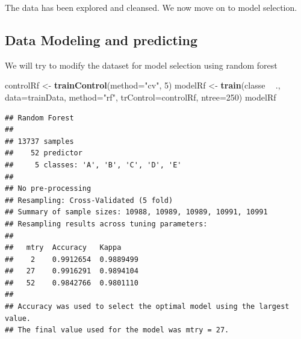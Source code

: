 \documentclass[
]{article}
\newenvironment{Shaded}{\begin{snugshade}}{\end{snugshade}}
\newcommand{\DataTypeTok}[1]{\textcolor[rgb]{0.13,0.29,0.53}{#1}}
\newcommand{\DecValTok}[1]{\textcolor[rgb]{0.00,0.00,0.81}{#1}}
\newcommand{\FloatTok}[1]{\textcolor[rgb]{0.00,0.00,0.81}{#1}}
\newcommand{\KeywordTok}[1]{\textcolor[rgb]{0.13,0.29,0.53}{\textbf{#1}}}
\newcommand{\NormalTok}[1]{#1}
\newcommand{\OperatorTok}[1]{\textcolor[rgb]{0.81,0.36,0.00}{\textbf{#1}}}
\newcommand{\StringTok}[1]{\textcolor[rgb]{0.31,0.60,0.02}{#1}}
\begin{document}
\begin{Shaded}
\end{Shaded}

The data has been explored and cleansed. We now move on to model
selection.

\hypertarget{data-modeling-and-predicting}{%
\subsection{Data Modeling and
predicting}\label{data-modeling-and-predicting}}

We will try to modify the dataset for model selection using random
forest

\begin{Shaded}
\begin{Highlighting}[]
\NormalTok{controlRf <-}\StringTok{ }\KeywordTok{trainControl}\NormalTok{(}\DataTypeTok{method=}\StringTok{"cv"}\NormalTok{, }\DecValTok{5}\NormalTok{)}
\NormalTok{modelRf <-}\StringTok{ }\KeywordTok{train}\NormalTok{(classe }\OperatorTok{~}\StringTok{ }\NormalTok{., }\DataTypeTok{data=}\NormalTok{trainData, }\DataTypeTok{method=}\StringTok{"rf"}\NormalTok{, }\DataTypeTok{trControl=}\NormalTok{controlRf, }\DataTypeTok{ntree=}\DecValTok{250}\NormalTok{)}
\NormalTok{modelRf}
\end{Highlighting}
\end{Shaded}

\begin{verbatim}
## Random Forest 
## 
## 13737 samples
##    52 predictor
##     5 classes: 'A', 'B', 'C', 'D', 'E' 
## 
## No pre-processing
## Resampling: Cross-Validated (5 fold) 
## Summary of sample sizes: 10988, 10989, 10989, 10991, 10991 
## Resampling results across tuning parameters:
## 
##   mtry  Accuracy   Kappa    
##    2    0.9912654  0.9889499
##   27    0.9916291  0.9894104
##   52    0.9842766  0.9801110
## 
## Accuracy was used to select the optimal model using the largest value.
## The final value used for the model was mtry = 27.
\end{verbatim}
\end{document}
